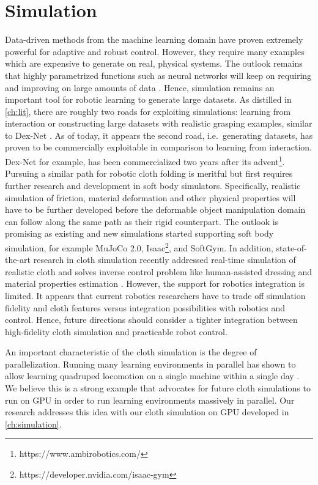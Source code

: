 \documentclass[\home/main.tex]{subfiles}
\begin{document}
\section{Simulation} \label{sec:towards_sim}
Data-driven methods from the machine learning domain have proven extremely powerful for adaptive and robust control. However, they require many examples which are expensive to generate on real, physical systems. The outlook remains that highly parametrized functions such as neural networks will keep on requiring and improving on large amounts of data \autocite{sun2017revisiting}. Hence, simulation remains an important tool for robotic learning to generate large datasets. As distilled in \cref{ch:lit}, there are roughly two roads for exploiting simulations: learning from interaction or constructing large datasets with realistic grasping examples, similar to Dex-Net \autocite{dexnet2}. As of today, it appears the second road, i.e.\ generating datasets, has proven to be commercially exploitable in comparison to learning from interaction. Dex-Net for example, has been commercialized two years after its advent\footnote{https://www.ambirobotics.com/}. Pursuing a similar path for robotic cloth folding is meritful but first requires further research and development in soft body simulators. Specifically,
realistic simulation of friction, material deformation and other physical properties will have to be further developed before the deformable object manipulation domain can follow along the same path as their rigid counterpart. The outlook is promising as  existing and new simulations started supporting soft body simulation, for example MuJoCo 2.0, Isaac\footnote{https://developer.nvidia.com/isaac-gym}, and SoftGym. In addition, state-of-the-art research in cloth simulation recently addressed real-time simulation of realistic cloth and solves inverse control problem like human-assisted dressing and material properties estimation \autocite{Junbang2019,li2021diffcloth}. However, the support for robotics integration is limited. It appears that current robotics researchers have to trade off simulation fidelity and cloth features versus integration possibilities with robotics and control. Hence, future directions should consider a tighter integration between high-fidelity cloth simulation and practicable robot control.

An important characteristic of the cloth simulation is the degree of parallelization. Running many learning environments in parallel has shown to allow learning quadruped locomotion on a single machine within a single day \autocite{rudin2021learning}. We believe this is a strong example that advocates for future cloth simulations to run on GPU in order to run learning environments massively in parallel. Our research addresses this idea with our cloth simulation on \gls{GPU} developed in \cref{ch:simulation}.    
\end{document}
